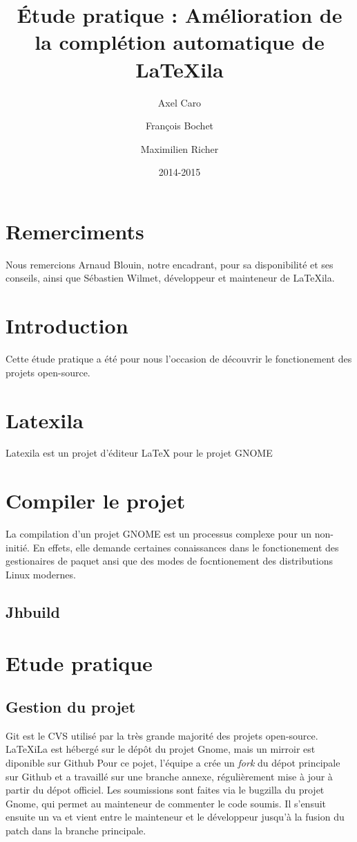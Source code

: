 \documentclass[a4paper,11pt]{report}
\title{Étude pratique : Amélioration de la complétion automatique de LaTeXila}
\author{Axel Caro\and François Bochet\and Maximilien Richer}
\date{2014-2015}
\begin{document}
\maketitle %
\tableofcontents %

\section{Remerciments} %
\label{cha:remerciments}
Nous remercions Arnaud Blouin, notre encadrant, pour sa disponibilité et ses conseils, ainsi que Sébastien Wilmet, développeur et mainteneur de LaTeXila.

\section{Introduction}
\label{cha:Introduction}
Cette étude pratique a été pour nous l'occasion de découvrir le fonctionement des projets open-source.

\section{Latexila}
\label{sec:latexila}

Latexila est un projet d'éditeur LaTeX pour le projet GNOME

\section{Compiler le projet}
\label{sec:compiler}
La compilation d'un projet GNOME est un processus complexe pour un non-initié. En effets, elle demande certaines conaissances dans le fonctionement des gestionaires de paquet ansi que des modes de focntionement des distributions Linux modernes.

\subsection{Jhbuild}
\label{sub:jhbuild}

\section{Etude pratique} %
\label{cha:etude_pratique}

\subsection{Gestion du projet} %
\label{sub:git}
Git est le CVS utilisé par la très grande majorité des projets open-source. LaTeXiLa est hébergé sur le dépôt du projet Gnome, mais un mirroir est diponible sur Github %
Pour ce pojet, l'équipe a crée un \textit{fork} du dépot principale sur Github et a travaillé sur une branche annexe, régulièrement mise à jour à partir du dépot officiel.
Les soumissions sont faites via le bugzilla du projet Gnome, qui permet au mainteneur de commenter le code soumis. Il s'ensuit ensuite un va et vient entre le mainteneur et le développeur jusqu'à la fusion du patch dans la branche principale.
\end{document}
